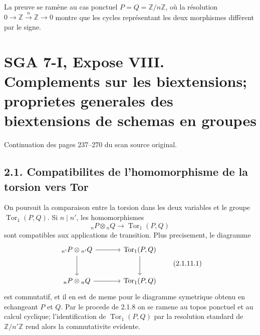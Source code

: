 \documentclass[11pt]{article}
\providecommand{\Spec}{\operatorname{Spec}}
\providecommand{\Pic}{\operatorname{Pic}}
\providecommand{\Tor}{\operatorname{Tor}}
\providecommand{\Ker}{\operatorname{Ker}}
\providecommand{\Z}{\mathbb Z}
\providecommand{\Q}{\mathbb Q}
\providecommand{\Ql}{\mathbb Q_\ell}
\providecommand{\Zl}{\mathbb Z_\ell}
\providecommand{\Gm}{\mathbb G_m}
\providecommand{\Hom}{\operatorname{Hom}}
\providecommand{\Ext}{\operatorname{Ext}}
\providecommand{\id}{\operatorname{id}}
\begin{document}
La preuve se ramène au cas ponctuel \(P=Q=\mathbb Z/n\mathbb Z\), où la résolution \(0\to\mathbb Z\xrightarrow{n}\mathbb Z\to0\) montre que les cycles représentant les deux morphismes diffèrent par le signe.



\providecommand{\Tate}{\mathrm T}
\providecommand{\Vtate}{\mathrm V}
\providecommand{\Biext}{\operatorname{Biext}}
\providecommand{\BIEXT}{\operatorname{BIEXT}}
\providecommand{\Ext}{\operatorname{Ext}}
\providecommand{\Tor}{\operatorname{Tor}}
\providecommand{\Hom}{\operatorname{Hom}}
\providecommand{\Coker}{\operatorname{Coker}}
\providecommand{\Spec}{\operatorname{Spec}}
\providecommand{\Pic}{\operatorname{Pic}}
\providecommand{\Ker}{\operatorname{Ker}}
\providecommand{\Gm}{\mathbb G_m}
\providecommand{\Ga}{\mathbb G_a}
\providecommand{\Z}{\mathbb Z}
\providecommand{\Q}{\mathbb Q}
\providecommand{\Ql}{\mathbb Q_\ell}
\providecommand{\Zl}{\mathbb Z_\ell}
\providecommand{\muN}{\boldsymbol\mu}
\providecommand{\nr}{\mathrm{nr}}
\providecommand{\ab}{\mathrm{ab}}
\providecommand{\tr}{\operatorname{tr}}
\providecommand{\id}{\mathrm{id}}


\section*{SGA 7-I, Expose VIII. Complements sur les biextensions; proprietes generales des biextensions de schemas en groupes}
\begin{center}
Continuation des pages 237--270 du scan source original.
\end{center}

\subsection*{2.1. Compatibilites de l'homomorphisme de la torsion vers Tor}

On poursuit la comparaison entre la torsion dans les deux variables et le groupe \(\Tor_1(P,Q)\).  Si \(n\mid n'\), les homomorphismes
\[
        {}_nP\otimes {}_nQ\longrightarrow \Tor_1(P,Q)
\]
sont compatibles aux applications de transition.  Plus precisement, le diagramme
\[
\begin{tikzcd}[column sep=large,row sep=large]
 {}_{n'}P\otimes {}_{n'}Q \arrow[r]\arrow[d] & \Tor_1(P,Q)\arrow[d]\\
 {}_{n}P\otimes {}_{n}Q \arrow[r] & \Tor_1(P,Q)
\end{tikzcd}
\qquad\text{(2.1.11.1)}
\]
est commutatif, et il en est de meme pour le diagramme symetrique obtenu en echangeant \(P\) et \(Q\).  Par le procede de 2.1.8 on se ramene au topos ponctuel et au calcul cyclique; l'identification de \(\Tor_1(P,Q)\) par la resolution standard de \(\Z/n'\Z\) rend alors la commutativite evidente.
\end{document}
